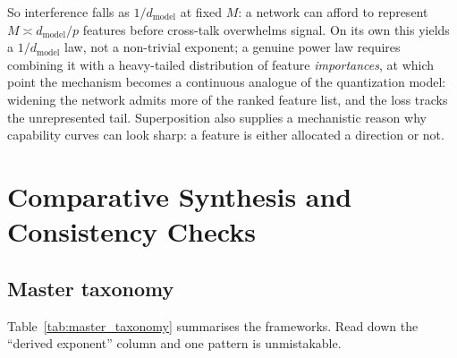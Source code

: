 \documentclass[11pt,a4paper]{article}
\theoremstyle{definition}
\begin{document}
So interference falls as $1/d_{\mathrm{model}}$ at fixed $M$: a network can afford to represent $M \asymp d_{\mathrm{model}}/p$ features before cross-talk overwhelms signal. On its own this yields a $1/d_{\mathrm{model}}$ law, not a non-trivial exponent; a genuine power law requires combining it with a heavy-tailed distribution of feature \emph{importances}, at which point the mechanism becomes a continuous analogue of the quantization model: widening the network admits more of the ranked feature list, and the loss tracks the unrepresented tail. Superposition also supplies a mechanistic reason why capability curves can look sharp: a feature is either allocated a direction or not.

\section{Comparative Synthesis and Consistency Checks}
\label{sec:taxonomy}

\subsection{Master taxonomy}

Table~\ref{tab:master_taxonomy} summarises the frameworks. Read down the ``derived exponent'' column and one pattern is unmistakable.
\end{document}
